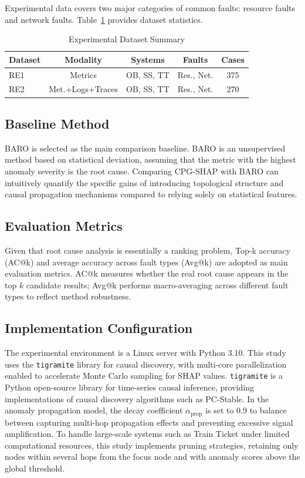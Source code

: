 \documentclass[conference]{IEEEtran}
\begin{document}
Experimental data covers two major categories of common faults: resource faults and network faults. Table~\ref{tab:dataset_summary} provides dataset statistics.

\begin{table}[htbp]
    \centering
    \caption{Experimental Dataset Summary}
    \label{tab:dataset_summary}
    \scriptsize
    \begin{tabular}{lcccc}
        \toprule
        \textbf{Dataset} & \textbf{Modality} & \textbf{Systems} & \textbf{Faults} & \textbf{Cases} \\
        \midrule
        RE1 & Metrics & OB, SS, TT & Res., Net. & 375 \\
        RE2 & Met.+Logs+Traces & OB, SS, TT & Res., Net. & 270 \\
        \bottomrule
    \end{tabular}
\end{table}

\subsection{Baseline Method}

BARO is selected as the main comparison baseline. BARO is an unsupervised method based on statistical deviation, assuming that the metric with the highest anomaly severity is the root cause. Comparing CPG-SHAP with BARO can intuitively quantify the specific gains of introducing topological structure and causal propagation mechanisms compared to relying solely on statistical features.

\subsection{Evaluation Metrics}

Given that root cause analysis is essentially a ranking problem, Top-k accuracy (AC@k) and average accuracy across fault types (Avg@k) are adopted as main evaluation metrics. AC@k measures whether the real root cause appears in the top $k$ candidate results; Avg@k performs macro-averaging across different fault types to reflect method robustness.

\subsection{Implementation Configuration}

The experimental environment is a Linux server with Python 3.10. This study uses the \texttt{tigramite} library \cite{runge2019} for causal discovery, with multi-core parallelization enabled to accelerate Monte Carlo sampling for SHAP values. \texttt{tigramite} is a Python open-source library for time-series causal inference, providing implementations of causal discovery algorithms such as PC-Stable. In the anomaly propagation model, the decay coefficient $\alpha_{\text{prop}}$ is set to 0.9 to balance between capturing multi-hop propagation effects and preventing excessive signal amplification. To handle large-scale systems such as Train Ticket under limited computational resources, this study implements pruning strategies, retaining only nodes within several hops from the focus node and with anomaly scores above the global threshold.
\end{document}
